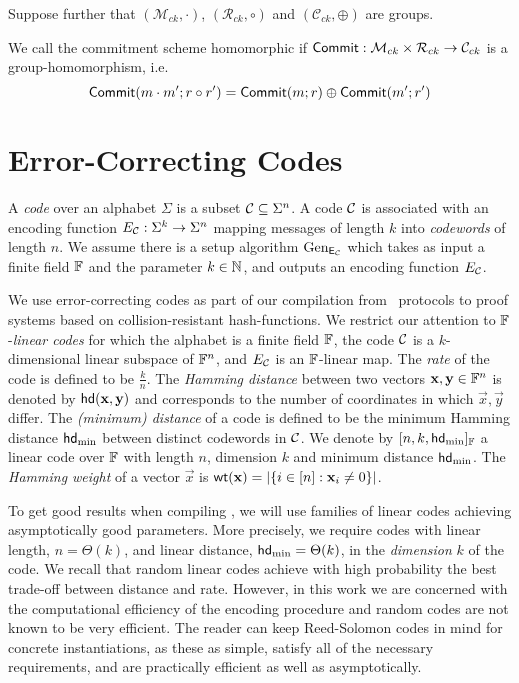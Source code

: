 Suppose further that $(\mathcal{M}_{ck},\cdot)$, $(\mathcal{R}_{ck},\circ)$ and $(\mathcal{C}_{ck},\oplus)$ are groups.
\begin{definition}
We call the commitment scheme homomorphic if $\mathsf{Commit}:\mathcal{M}_{ck}\times\mathcal{R}_{ck}\to \mathcal{C}_{ck}$ is a group-homomorphism, i.e. 
$$\mathsf{Commit}(m \cdot m';r\circ r')=\mathsf{Commit}(m;r)\oplus \mathsf{Commit}(m';r')$$
\end{definition}

\section{Error-Correcting Codes}\label{sec:LC}
A \emph{code} over an alphabet $\Sigma$ is a subset $\mathcal{C}\subseteq \Sigma^n$. A code $\mathcal{C}$ is associated with an encoding function $E_{\mathcal{C}}:\Sigma^k\to \Sigma^n$ mapping messages of length $k$ into \emph{codewords} of length $n$.
We assume there is a setup algorithm ${\text{Gen}}_{\mathsf{E}_{\mathcal{C}}}$ which takes as input a finite field $\mathbb{F}$ and the parameter $k \in \mathbb{N}$, and outputs an encoding function $E_{\mathcal{C}}$.

We use error-correcting codes as part of our compilation from \ILC\ protocols to proof systems based on collision-resistant hash-functions. We restrict our attention to $\mathbb{F}$-\emph{linear codes} for which the alphabet is a finite field $\mathbb{F}$, the code $\mathcal{C}$ is a $k$-dimensional linear subspace of $\mathbb{F}^n$, and $E_{\mathcal{C}}$ is an $\mathbb{F}$-linear map. The \emph{rate} of the code is defined to be $\frac{k}{n}$. The \emph{Hamming distance} between two vectors $\mathbf{x},\mathbf{y} \in \mathbb{F}^n$ is denoted by $\mathsf{hd}(\mathbf{x},\mathbf{y})$ and corresponds to the number of coordinates in which $\vec{x},\vec{y}$ differ. The \emph{(minimum) distance} of a code is defined to be the minimum Hamming distance $\mathsf{hd}_{\mathrm{min}}$ between distinct codewords in $\mathcal{C}$. %
We denote by $[n,k,\mathsf{hd}_{\mathrm{min}}]_{\mathbb{F}}$ a linear code over $\mathbb{F}$ with length $n$, dimension $k$ and minimum distance $\mathsf{hd}_{\mathrm{min}}$. The \emph{Hamming weight} of a vector $\vec{x}$ is $\mathsf{wt}(\mathbf{x})=|\{i \in [n]: \mathbf{x}_i \neq 0\}|$.


To get good results when compiling , we will use families of linear codes achieving asymptotically good parameters. More precisely, we require codes with linear length, $n=\Theta(k)$, and linear distance, $\mathsf{hd}_{\mathrm{min}}=\Theta(k)$, in the \emph{dimension} $k$ of the code.
We recall that random linear codes achieve with high probability the best trade-off between distance and rate. However, in this work we are concerned with the computational efficiency of the encoding procedure and random codes are not known to be very efficient. The reader can keep Reed-Solomon codes in mind for concrete instantiations, as these as simple, satisfy all of the necessary requirements, and are practically efficient as well as asymptotically.